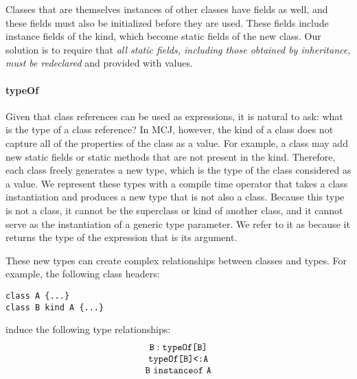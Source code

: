 \documentclass[nocopyrightspace,10pt]{acm-sigplan}
\begin{document}
Classes that are themselves instances of other classes have fields as
well, and these fields must also be initialized before they are used.
These fields include instance fields of the kind, which become static
fields of the new class.  Our solution is to require that \emph{all
  static fields, including those obtained by inheritance, must be
  redeclared} and provided with values.




\paragraph{typeOf}

Given that class references can be used as expressions, it is natural
to ask: what is the type of a class reference?  In MCJ, however, the
kind of a class does not capture all of the properties of the class as
a value.  For example, a class may add new static fields or static
methods that are not present in the kind.  Therefore, each class
freely generates a new type, which is the type of the class considered
as a value.  We represent these types with a compile time
{} operator that takes a class instantiation and produces
a new type that is not also a class.  Because this type is not a class, it
cannot be the superclass or kind of another class, and it cannot serve
as the instantiation of a generic type parameter.  We refer to it as
{} because it returns the type of the expression that is its
argument.

These new types can create complex relationships between classes and types.  For
example, the following class headers:

\begin{verbatim}
class A {...}
class B kind A {...}
\end{verbatim}

induce the following type relationships:
\begin{displaymath}
\begin{array}{c}
{\mbox {\tt B}} : {\mathtt{{typeOf}}{\mbox{\tt [}}\mbox {\tt B}\mbox{{\tt ]}}} \\
{\mathtt{{typeOf}}{\mbox{\tt [}}\mbox {\tt B}\mbox{{\tt ]}}} \mbox{\tt <:} {\mbox {\tt A}} \\
\mbox {\tt B}~ {\mathtt {instanceof}}\ \mbox {\tt A}
\end{array}
\end{displaymath}
\end{document}
